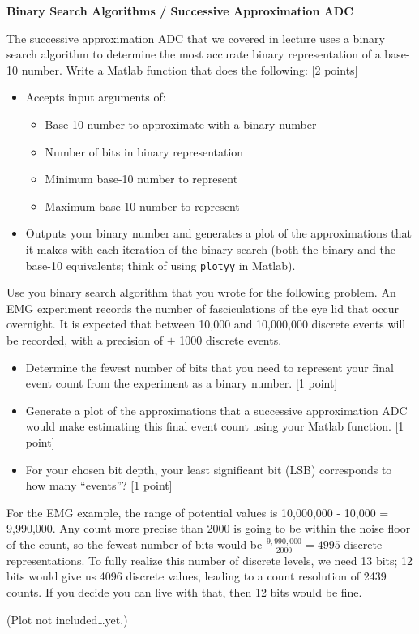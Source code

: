 \item {\bf Binary Search Algorithms / Successive Approximation ADC}

The successive approximation ADC that we covered in lecture uses a binary search algorithm to determine the most accurate binary representation of a base-10 number.  Write a Matlab function that does the following: [2 points]

\begin{itemize}
    \item Accepts input arguments of:
    \begin{itemize}
        \item Base-10 number to approximate with a binary number
        \item Number of bits in binary representation
        \item Minimum base-10 number to represent
        \item Maximum base-10 number to represent
    \end{itemize}

    \item Outputs your binary number and generates a plot of the approximations that it makes with each iteration of the binary search (both the binary and the base-10 equivalents; think of using {\tt plotyy} in Matlab).
\end{itemize}

Use you binary search algorithm that you wrote for the following problem.  An EMG experiment records the number of fasciculations of the eye lid that occur overnight.  It is expected that between 10,000 and 10,000,000 discrete events will be recorded, with a precision of $\pm$ 1000 discrete events.

\begin{itemize}
    \item Determine the fewest number of bits that you need to represent your final event count from the experiment as a binary number. [1 point]
    \item Generate a plot of the approximations that a successive approximation ADC would make estimating this final event count using your Matlab function. [1 point]
    \item For your chosen bit depth, your least significant bit (LSB) corresponds to how many ``events''? [1 point]
\end{itemize}

\clearpage


For the EMG example, the range of potential values is 10,000,000 - 10,000 =
9,990,000.  Any count more precise than 2000 is going to be within the noise
floor of the count, so the fewest number of bits would be
$\frac{9,990,000}{2000} = 4995$ discrete representations.  To fully realize
this number of discrete levels, we need 13 bits; 12 bits would give us 4096
discrete values, leading to a count resolution of 2439 counts.  If you decide
you can live with that, then 12 bits would be fine.

(Plot not included\ldots yet.)
